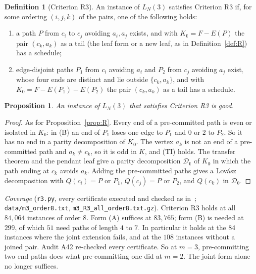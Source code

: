 \documentclass[11pt]{amsart}
\newtheorem{proposition}[theorem]{Proposition}
\theoremstyle{definition}
\newtheorem{definition}[theorem]{Definition}
\newcommand{\cD}{\mathcal D}
\begin{document}
\begin{definition}[Criterion R3]\label{def:R3}
An instance of $L_N(3)$ satisfies Criterion R3 if, for some ordering $(i,j,k)$ of the pairs, one of
the following holds:
\begin{enumerate}[label=(\Alph*)]
\item a path $P$ from $c_i$ to $c_j$ avoiding $a_i,a_j$ exists, and with $K_0=F-E(P)$ the pair
$(c_k,a_k)$ as a tail (the leaf form or a new leaf, as in Definition~\ref{def:R}) has a schedule;
\item edge-disjoint paths $P_1$ from $c_i$ avoiding $a_i$ and $P_2$ from $c_j$ avoiding $a_j$ exist,
whose four ends are distinct and lie outside $\{c_k,a_k\}$, and with $K_0=F-E(P_1)-E(P_2)$ the pair
$(c_k,a_k)$ as a tail has a schedule.
\end{enumerate}
\end{definition}

\begin{proposition}\label{prop:R3}
An instance of $L_N(3)$ that satisfies Criterion R3 is good.
\end{proposition}

\begin{proof}
As for Proposition~\ref{prop:R}. Every end of a pre-committed path is even or isolated in $K_0$: in
(B) an end of $P_1$ loses one edge to $P_1$ and $0$ or $2$ to $P_2$. So it has no end in a parity
decomposition of $K_0$. The vertex $a_k$ is not an end of a pre-committed path and $a_k\ne c_k$, so it is odd in
$K$, and (TI) holds. The transfer theorem and the pendant leaf give a parity decomposition $\cD_0$ of $K_0$ in which the path ending at $c_k$ avoids $a_k$. Adding the
pre-committed paths gives a Lov\'asz decomposition with $Q(c_i)=P$ or $P_1$, $Q(c_j)=P$ or $P_2$, and $Q(c_k)$ in
$\cD_0$.
\end{proof}

\emph{Coverage} (\texttt{r3.py}, every certificate executed and checked as in~\cite{LN};
\texttt{data/m3\_order8.txt}, \texttt{m3\_R3\_all\_order8.txt.gz}). Criterion R3 holds at all
$84{,}064$ instances of order $8$. Form (A) suffices at $83{,}765$; form (B) is needed at $299$, of
which $51$ need paths of length $4$ to $7$. In particular it holds at the $84$ instances where the
joint extension fails, and at the $108$ instances without a joined pair. Audit A42 re-checked every
certificate.
So at $m=3$, pre-committing two end paths does what pre-committing one did at $m=2$. The joint form
alone no longer suffices.
\end{document}
